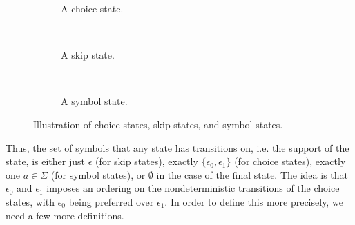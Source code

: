 \begin{figure}[!ht]
  \centering
  \begin{subfigure}[b]{0.3\textwidth}
    \centering
    \caption{A choice state.}
  \end{subfigure}
  ~
  \begin{subfigure}[b]{0.3\textwidth}
    \centering
    \caption{A skip state.}
  \end{subfigure}
  ~
  \begin{subfigure}[b]{0.3\textwidth}
    \centering
    \caption{A symbol state.}
  \end{subfigure}
  \caption{Illustration of choice states, skip states, and symbol states.}
  \label{fig:nfst-states}
\end{figure}

Thus, the set of symbols that any state has transitions on, i.e. the support of
the state, is either just $\epsilon$ (for skip states), exactly
$\{\epsilon_0, \epsilon_1\}$ (for choice states), exactly one $a \in \Sigma$
(for symbol states), or $\emptyset$ in the case of the final state. The idea is
that $\epsilon_0$ and $\epsilon_1$ imposes an ordering on the nondeterministic
transitions of the choice states, with $\epsilon_0$ being preferred over
$\epsilon_1$. In order to define this more precisely, we need a few more
definitions.

